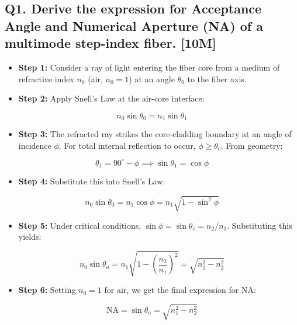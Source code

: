 \subsection{Q1. Derive the expression for Acceptance Angle and Numerical Aperture (NA) of a multimode step-index fiber. [10M]}
\begin{itemize}
  \item   \textbf{Step 1:} Consider a ray of light entering the fiber core from a medium of refractive index $n_0$ (air, $n_0 = 1$) at an angle $\theta_0$ to the fiber axis.
  \item   \textbf{Step 2:} Apply Snell's Law at the air-core interface:
\end{itemize}
    \[ n_0 \sin \theta_0 = n_1 \sin \theta_1 \]
\begin{itemize}
  \item   \textbf{Step 3:} The refracted ray strikes the core-cladding boundary at an angle of incidence $\phi$. For total internal reflection to occur, $\phi \ge \theta_c$. From geometry:
\end{itemize}
    \[ \theta_1 = 90^\circ - \phi \implies \sin \theta_1 = \cos \phi \]
\begin{itemize}
  \item   \textbf{Step 4:} Substitute this into Snell's Law:
\end{itemize}
    \[ n_0 \sin \theta_0 = n_1 \cos \phi = n_1 \sqrt{1 - \sin^2 \phi} \]
\begin{itemize}
  \item   \textbf{Step 5:} Under critical conditions, $\sin \phi = \sin \theta_c = n_2/n_1$. Substituting this yields:
\end{itemize}
    \[ n_0 \sin \theta_a = n_1 \sqrt{1 - \left(\frac{n_2}{n_1}\right)^2} = \sqrt{n_1^2 - n_2^2} \]
\begin{itemize}
  \item   \textbf{Step 6:} Setting $n_0 = 1$ for air, we get the final expression for NA:
\end{itemize}
    \[ \text{NA} = \sin \theta_a = \sqrt{n_1^2 - n_2^2} \]

